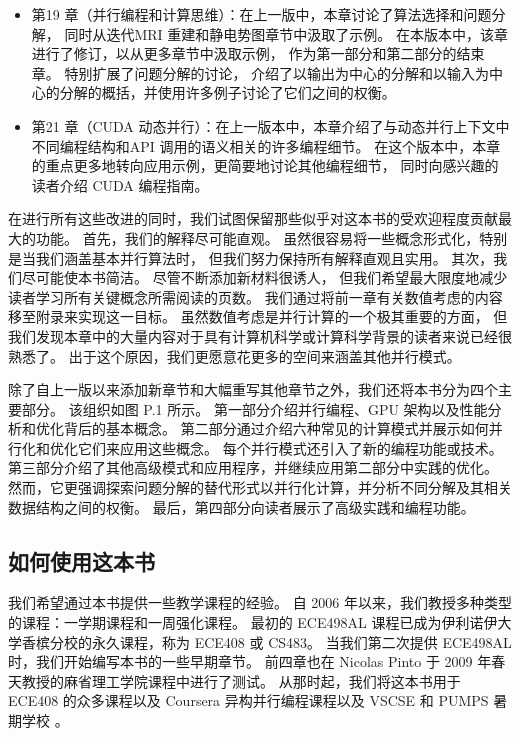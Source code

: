 \begin{itemize}
	\item 第19 章（并行编程和计算思维）：在上一版中，本章讨论了算法选择和问题分解，
		同时从迭代MRI 重建和静电势图章节中汲取了示例。 在本版本中，该章进行了修订，以从更多章节中汲取示例，
		作为第一部分和第二部分的结束章。 特别扩展了问题分解的讨论，
		介绍了以输出为中心的分解和以输入为中心的分解的概括，并使用许多例子讨论了它们之间的权衡。

	\item 第21 章（CUDA 动态并行）：在上一版本中，本章介绍了与动态并行上下文中不同编程结构和API 
		调用的语义相关的许多编程细节。 在这个版本中，本章的重点更多地转向应用示例，更简要地讨论其他编程细节，
		同时向感兴趣的读者介绍 CUDA 编程指南。
\end{itemize}

在进行所有这些改进的同时，我们试图保留那些似乎对这本书的受欢迎程度贡献最大的功能。 
首先，我们的解释尽可能直观。 虽然很容易将一些概念形式化，特别是当我们涵盖基本并行算法时，
但我们努力保持所有解释直观且实用。 其次，我们尽可能使本书简洁。 尽管不断添加新材料很诱人，
但我们希望最大限度地减少读者学习所有关键概念所需阅读的页数。 我们通过将前一章有关数值考虑的内容移至附录来实现这一目标。 
虽然数值考虑是并行计算的一个极其重要的方面，
但我们发现本章中的大量内容对于具有计算机科学或计算科学背景的读者来说已经很熟悉了。 
出于这个原因，我们更愿意花更多的空间来涵盖其他并行模式。

除了自上一版以来添加新章节和大幅重写其他章节之外，我们还将本书分为四个主要部分。 
该组织如图 P.1 所示。 第一部分介绍并行编程、GPU 架构以及性能分析和优化背后的基本概念。 
第二部分通过介绍六种常见的计算模式并展示如何并行化和优化它们来应用这些概念。 
每个并行模式还引入了新的编程功能或技术。 第三部分介绍了其他高级模式和应用程序，并继续应用第二部分中实践的优化。 
然而，它更强调探索问题分解的替代形式以并行化计算，并分析不同分解及其相关数据结构之间的权衡。 
最后，第四部分向读者展示了高级实践和编程功能。

\subsection{如何使用这本书}
我们希望通过本书提供一些教学课程的经验。 自 2006 年以来，我们教授多种类型的课程：一学期课程和一周强化课程。 
最初的 ECE498AL 课程已成为伊利诺伊大学香槟分校的永久课程，称为 ECE408 或 CS483。 
当我们第二次提供 ECE498AL 时，我们开始编写本书的一些早期章节。 
前四章也在 Nicolas Pinto 于 2009 年春天教授的麻省理工学院课程中进行了测试。
从那时起，我们将这本书用于 ECE408 的众多课程以及 Coursera 异构并行编程课程以及 VSCSE 和 PUMPS 暑期学校 。

